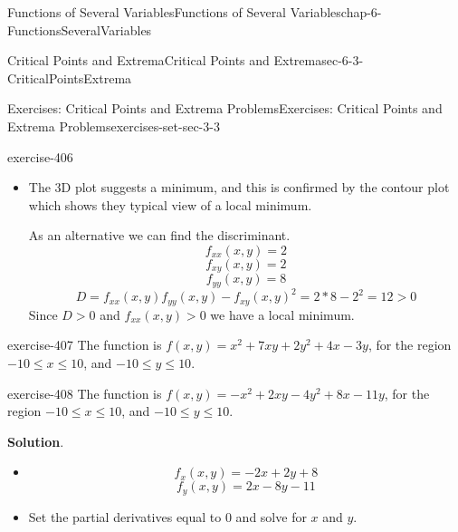 \documentclass[oneside,10pt,]{book}
\numberwithin{equation}{section}
\newcommand{\gt}{>}
\begin{document}
\begin{chapterptx}{Functions of Several Variables}{}{Functions of Several Variables}{}{}{chap-6-FunctionsSeveralVariables}
\begin{sectionptx}{Critical Points and Extrema}{}{Critical Points and Extrema}{}{}{sec-6-3-CriticalPointsExtrema}
\begin{exercises-subsection-numberless}{Exercises: Critical Points and Extrema Problems}{}{Exercises: Critical Points and Extrema Problems}{}{}{exercises-set-sec-3-3}
\begin{divisionexercise}{1}{}{}{exercise-406}
\begin{itemize}[label=\textbullet]
\begin{sidebyside}{2}{0.025}{0.025}{0.05}
\begin{sbspanel}{0.45}[center]
\hypertarget{p-2395}{}%
3D Plot%
\end{sbspanel}%
\begin{sbspanel}{0.45}%
\par
\hypertarget{p-2396}{}%
Contour Plot%
\end{sbspanel}%
\end{sidebyside}%
\item{}\hypertarget{p-2397}{}%
The 3D plot suggests a minimum, and this is confirmed by the contour plot which shows they typical view of a local minimum.%
\par
\hypertarget{p-2398}{}%
As an alternative we can find the discriminant.%
%
\begin{equation*}
f_{xx}  (x,y)=2
\end{equation*}
%
\begin{equation*}
f_{xy}  (x,y)=2
\end{equation*}
%
\begin{equation*}
f_{yy}  (x,y)=8
\end{equation*}
%
\begin{equation*}
D=f_{xx}  (x,y)f_{yy}  (x,y)-f_{xy}  (x,y)^2=2*8-2^2=12>0
\end{equation*}
\hypertarget{p-2399}{}%
Since \(D\gt 0\) and \(f_{xx}  (x,y)\gt 0\) we have a local minimum.%
\end{itemize}
\end{divisionexercise}%
\begin{divisionexercise}{2}{}{}{exercise-407}%
\hypertarget{p-2400}{}%
The function is \(f(x,y)=x^2+7xy+2y^2+4x-3y\), for the region \(-10\le x\le 10\), and \(-10\le y\le 10\).%
\end{divisionexercise}%
\begin{divisionexercise}{3}{}{}{exercise-408}%
\hypertarget{p-2401}{}%
The function is \(f(x,y)=-x^2+2xy-4y^2+8x-11y\), for the region \(-10\le x\le 10\), and \(-10\le y\le 10\).%
\par\smallskip%
\noindent\textbf{Solution}.\hypertarget{solution-206}{}\quad%
\leavevmode%
\begin{itemize}[label=\textbullet]
\item{}%
\begin{equation*}
f_x  (x,y)=-2x+2y+8
\end{equation*}
%
\begin{equation*}
f_y  (x,y)=2x-8y-11
\end{equation*}
%
\item{}\hypertarget{p-2402}{}%
Set the partial derivatives equal to 0 and solve for \(x\) and \(y\).%

\end{itemize}
\end{divisionexercise}
\end{exercises-subsection-numberless}
\end{sectionptx}
\end{chapterptx}
\end{document}
